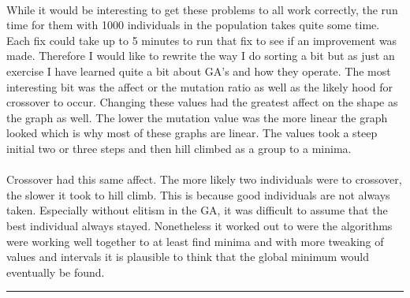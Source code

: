 \documentclass[paper=a4, fontsize=11pt]{scrartcl} %
\numberwithin{equation}{section} %
\numberwithin{figure}{section} %
\numberwithin{table}{section} %
\newcommand{\horrule}[1]{\rule{\linewidth}{#1}} %
\begin{document}
\paragraph{} While it would be interesting to get these problems to all work correctly, the run time for them with 1000 individuals in the population takes quite some time. Each fix could take up to 5 minutes to run that fix to see if an improvement was made. Therefore I would like to rewrite the way I do sorting a bit but as just an exercise I have learned quite a bit about GA's and how they operate. The most interesting bit was the affect or the mutation ratio as well as the likely hood for crossover to occur. Changing these values had the greatest affect on the shape as the graph as well. The lower the mutation value was the more linear the graph looked which is why most of these graphs are linear. The values took a steep initial two or three steps and then hill climbed as a group to a minima.

\paragraph{} Crossover had this same affect. The more likely two individuals were to crossover, the slower it took to hill climb. This is because good individuals are not always taken. Especially without elitism in the GA, it was difficult to assume that the best individual always stayed. Nonetheless it worked out to were the algorithms were working well together to at least find minima and with more tweaking of values and intervals it is plausible to think that the global minimum would eventually be found.

\horrule{0.5pt} \\[0.4cm] %
\end{document}

